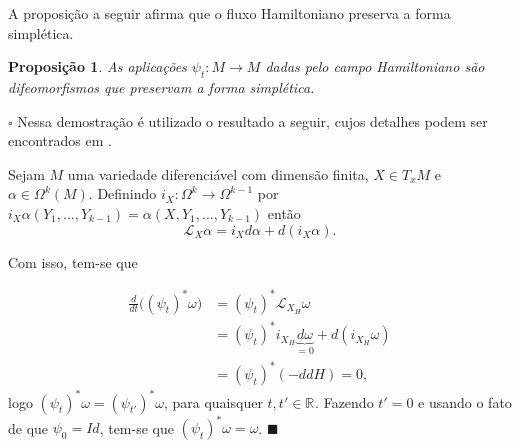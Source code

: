 \documentclass[12pt]{book}
\newtheorem{proposicao}[teorema]{Proposição}
\newenvironment{prova}[1]{$\square$ #1}{\hfill$\blacksquare$}
\newcommand{\bigparenteses}[1]{\Big( #1 \Big) }
\newcommand{\liederivada}[1]{\mathcal{L}_{#1}}
\newcommand{\real}[1]{\mathbb{R}^{#1}}
\begin{document}
	A proposição a seguir afirma que o fluxo Hamiltoniano preserva a forma simplética.
	
	\begin{proposicao}\label{proposicao_familia_simplectomorfismos}
		As aplicações $\psi_{t}:M\to M$ dadas pelo campo Hamiltoniano são difeomorfismos que preservam a forma simplética.
	\end{proposicao}
	\begin{prova}
		Nessa demostração é utilizado o resultado a seguir, cujos detalhes podem ser encontrados em \cite{nakahara}.
		
		Sejam $M$ uma variedade diferenciável com dimensão finita, $X \in T_{x}M$ e $\alpha \in \Omega^{k}(M)$. Definindo $i_{X}:\Omega^{k} \to \Omega^{k-1}$ por $i_{X}\alpha(Y_{1}, \dots, Y_{k-1}) = \alpha(X, Y_{1}, \dots, Y_{k-1})$ então
		$$
		\liederivada{X}\alpha = i_{X}d\alpha + d(i_{X}\alpha).
		$$
		
		Com isso, tem-se que
		
		$$
		\begin{aligned}
		\frac{d}{dt}\bigparenteses{(\psi_{t})^{*}\omega} 
		&= (\psi_{t})^{*} \liederivada{X_{H}}\omega  
		\\
		&= (\psi_{t})^{*} i_{X_{H}}\underbrace{d\omega }_ {=0}+ d(i_{X_{H}}\omega) 
		\\
		&= (\psi_{t})^{*} (-ddH)=0,
		\end{aligned}
		$$
		logo $(\psi_{t})^{*} \omega = (\psi_{t'})^{*} \omega$, para quaisquer $t, t' \in \real{}$. Fazendo $t'=0$ e usando o fato de que $\psi_{0} = Id$, tem-se que  $(\psi_{t})^{*} \omega = \omega$.
	\end{prova}
	
	
	
\end{document}
